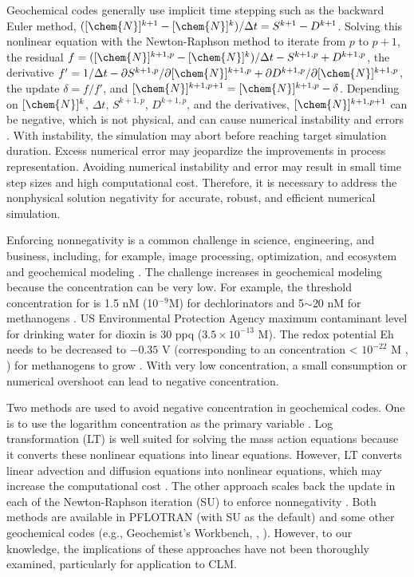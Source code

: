 \documentclass[gmd, manuscript]{copernicus}
\begin{document}
Geochemical codes generally use implicit time stepping such as the backward
Euler method, $([\chem{N}]^{k+1} - [\chem{N}]^k)/\Delta t = S^{k+1} - D^{k+1}$.
Solving this nonlinear equation with the Newton-Raphson method to iterate from
$p$ to $p+1$, the residual $f = ([\chem{N}]^{k+1,p}-[\chem{N}]^k)/{\Delta t} -
S^{k+1,p} + D^{k+1,p}$, the derivative $f'={1}/{\Delta t}  - {\partial
S^{k+1,p}}/{\partial [\chem{N}]^{k+1,p}} + {\partial D^{k+1,p}}/{\partial
[\chem{N}]^{k+1,p}}$, the update $\delta = f/f'$, and $[\chem{N}]^{k+1,p+1} =
[\chem{N}]^{k+1,p} - \delta$.  
Depending on $[\chem{N}]^k$, $\Delta t$, $S^{k+1,p}$, $D^{k+1,p}$, and the
derivatives, $[\chem{N}]^{k+1,p+1}$ can be negative, which is not physical, and
can cause numerical instability and errors \citep{Shampine2005}. With
instability, the simulation may abort before reaching target
simulation duration. Excess numerical error may jeopardize the improvements in
process representation. Avoiding numerical instability and error may result in
small time step sizes and high computational cost. Therefore, it is necessary to
address the nonphysical solution negativity for accurate, robust, and efficient numerical
simulation.  

Enforcing nonnegativity is a common challenge in science, engineering, and
business, including, for example, image processing, optimization, and ecosystem
and geochemical modeling
\citep{Antonelli2009,Broekhuizen2008,Bruggeman2007,Burchard2003,Burchard2005,Chen2009,Pierre2000,Shampine2005}.
The challenge increases in geochemical modeling because the concentration can
be very low. For example, the threshold concentration for  is 1.5
\unit{nM} (10$^{-9}$\unit{M}) for dechlorinators and 5$\sim$20 \unit{nM} for
methanogens \citep{Fennell1998}.  US Environmental Protection Agency maximum contaminant level for
drinking water for dioxin is 30 \unit{ppq} ($3.5\times 10^{-13}$ \unit{M}). The
redox potential Eh needs to be decreased to $-0.35$ \unit{V} (corresponding to an
 concentration < $10^{-22}$ \unit{M} \citeauthor{Hungate1975},
\citeyear{Hungate1975}) for methanogens to grow \citep{Jarrell1985}. With very
low concentration, a small consumption or numerical overshoot can lead to
negative concentration.  

Two methods are used to avoid negative concentration in geochemical codes. One
is to use the logarithm concentration as the primary variable
\citep{Bethke2007,Hammond2003,Parkhurst1999}.  Log transformation (LT) is well
suited for solving the mass action equations because it converts these nonlinear
equations into linear equations. However, LT converts linear advection and
diffusion equations into nonlinear equations, which may increase the
computational cost \citep{Hammond2003}. The other approach scales back the
update in each of the Newton-Raphson iteration (SU) to enforce nonnegativity
\citep{Bethke2007,Hammond2003}. Both methods are available in PFLOTRAN \citep{Lichtner2015} (with SU as the default) and
some other geochemical codes (e.g., Geochemist's Workbench,
\citeauthor{Bethke2007}, \citeyear{Bethke2007}). However, to our knowledge, the
implications of these approaches have not been thoroughly examined,
particularly for application to CLM. 
\end{document}
